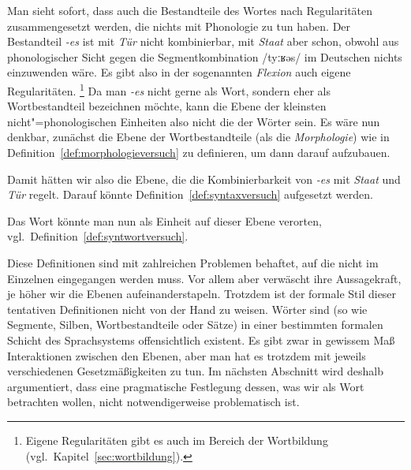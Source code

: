\begin{exe}
  \ex
  \begin{xlist}
  \end{xlist}
\end{exe}

\newcommand{\Quotenonphonoleinheitwort}{Da man \textit{-es} nicht gerne als Wort, sondern eher als Wortbestandteil bezeichnen möchte, kann die Ebene der kleinsten nicht"=phonologischen Einheiten also nicht die der Wörter sein.}

Man sieht sofort, dass auch die Bestandteile des Wortes nach Regularitäten zusammengesetzt werden, die nichts mit Phonologie zu tun haben.
Der Bestandteil \textit{-es} ist mit \textit{Tür} nicht kombinierbar, mit \textit{Staat} aber schon, obwohl aus phonologischer Sicht gegen die Segmentkombination /tyːʁəs/ im Deutschen nichts einzuwenden wäre.
Es gibt also in der sogenannten \textit{Flexion} auch eigene Regularitäten.%
\footnote{Eigene Regularitäten gibt es auch im Bereich der Wortbildung (vgl.\ Kapitel~\ref{sec:wortbildung}).}
\label{arbref:9234645}{\Quotenonphonoleinheitwort}
Es wäre nun denkbar, zunächst die Ebene der Wortbestandteile (als die \textit{Morphologie}) wie in Definition~\ref{def:morphologieversuch} zu definieren, um dann darauf aufzubauen.



Damit hätten wir also die Ebene, die die Kombinierbarkeit von \textit{-es} mit \textit{Staat} und \textit{Tür} regelt.
Darauf könnte Definition~\ref{def:syntaxversuch} aufgesetzt werden.


Das Wort könnte man nun als Einheit auf dieser Ebene verorten, vgl.\ Definition~\ref{def:syntwortversuch}.


Diese Definitionen sind mit zahlreichen Problemen behaftet, auf die nicht im Einzelnen eingegangen werden muss.
Vor allem aber verwäscht ihre Aussagekraft, je höher wir die Ebenen aufeinanderstapeln.
Trotzdem ist der formale Stil dieser tentativen Definitionen nicht von der Hand zu weisen.
Wörter sind (so wie Segmente, Silben, Wortbestandteile oder Sätze) in einer bestimmten formalen Schicht des Sprachsystems offensichtlich existent.
Es gibt zwar in gewissem Maß Interaktionen zwischen den Ebenen, aber man hat es trotzdem mit jeweils verschiedenen Gesetzmäßigkeiten zu tun.
Im nächsten Abschnitt wird deshalb argumentiert, dass eine pragmatische Festlegung dessen, was wir als Wort betrachten wollen, nicht notwendigerweise problematisch ist.


